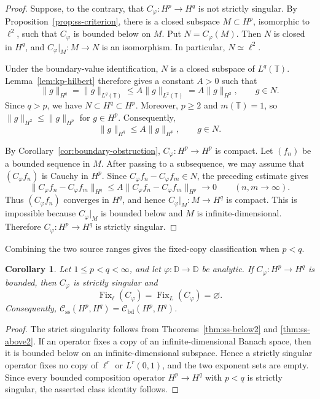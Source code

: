 \documentclass[10pt,a4paper]{amsart}
\newtheorem{corollary}[theorem]{Corollary}
\newcommand{\D}{\mathbb{D}}
\newcommand{\T}{\mathbb{T}}
\newcommand{\CB}{\mathcal C_{\mathrm{bd}}}
\newcommand{\CS}{\mathcal C_{\mathrm{ss}}}
\begin{document}
\begin{proof}
Suppose, to the contrary, that \(C_\varphi:H^p\to H^q\) is not
strictly singular. By Proposition~\ref{prop:ss-criterion}, there is a
closed subspace \(M\subset H^p\), isomorphic to \(\ell^2\), such that
\(C_\varphi\) is bounded below on \(M\). Put \(N=C_\varphi(M)\).
Then \(N\) is closed in \(H^q\), and
\(C_\varphi|_M:M\to N\) is an isomorphism. In particular,
\(N\simeq\ell^2\).

Under the boundary-value identification, \(N\) is a closed subspace of
\(L^q(\T)\). Lemma~\ref{lem:kp-hilbert} therefore
gives a constant \(A>0\) such that
\[
        \|g\|_{H^q}
        =
        \|g\|_{L^q(\T)}
        \le
        A\|g\|_{L^2(\T)}
        =
        A\|g\|_{H^2},
        \qquad
        g\in N.
\]
Since \(q>p\), we have \(N\subset H^q\subset H^p\). Moreover,
\(p\ge2\) and \(m(\T)=1\), so
\(\|g\|_{H^2}\le\|g\|_{H^p}\) for \(g\in H^p\). Consequently,
\[
        \|g\|_{H^q}
        \le
        A\|g\|_{H^p},
        \qquad
        g\in N.
\]

By Corollary~\ref{cor:boundary-obstruction},
\(C_\varphi:H^p\to H^p\) is compact. Let \((f_n)\) be a bounded
sequence in \(M\). After passing to a subsequence, we may assume that
\((C_\varphi f_n)\) is Cauchy in \(H^p\). Since
\(C_\varphi f_n-C_\varphi f_m\in N\), the preceding estimate gives
\[
        \|C_\varphi f_n-C_\varphi f_m\|_{H^q}
        \le
        A\|C_\varphi f_n-C_\varphi f_m\|_{H^p}
        \longrightarrow0
        \qquad (n,m\to\infty).
\]
Thus \((C_\varphi f_n)\) converges in \(H^q\), and hence
\(C_\varphi|_M:M\to H^q\) is compact. This is impossible because
\(C_\varphi|_M\) is bounded below and \(M\) is infinite-dimensional.
Therefore \(C_\varphi:H^p\to H^q\) is strictly singular.
\end{proof}

Combining the two source ranges gives the fixed-copy classification when \(p<q\).

\begin{corollary}
\label{cor:p-lt-q}
Let \(1\le p<q<\infty\), and let \(\varphi:\D\to\D\) be analytic.
If \(C_\varphi:H^p\to H^q\) is bounded, then \(C_\varphi\) is strictly
singular and
\[
        \operatorname{Fix}_{\ell}(C_\varphi)
        =
        \operatorname{Fix}_{L}(C_\varphi)
        =
        \varnothing.
\]
Consequently,
\(\CS(H^p,H^q)=\CB(H^p,H^q)\).
\end{corollary}

\begin{proof}
The strict singularity follows from
Theorems~\ref{thm:ss-below2} and
\ref{thm:ss-above2}.  If an operator fixes a copy of an
infinite-dimensional Banach space, then it is bounded below on an
infinite-dimensional subspace.  Hence a strictly singular operator fixes
no copy of \(\ell^r\) or \(L^r(0,1)\), and the two exponent sets are
empty.  Since every bounded composition operator \(H^p\to H^q\) with
\(p<q\) is strictly singular,  the asserted class identity follows.
\end{proof}
\end{document}
